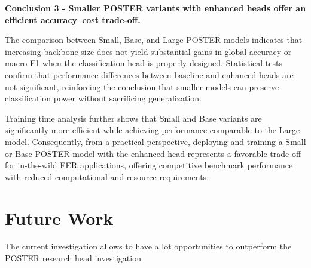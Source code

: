 \textbf{Conclusion 3 - Smaller \gls{POSTER} variants with enhanced heads offer an efficient accuracy–cost trade‑off.}

The comparison between Small, Base, and Large \gls{POSTER} models indicates that increasing backbone size does not yield substantial gains in global accuracy or macro‑F1 when the classification head is properly designed. Statistical tests confirm that performance differences between baseline and enhanced heads are not significant, reinforcing the conclusion that smaller models can preserve classification power without sacrificing generalization.

Training time analysis further shows that Small and Base variants are significantly more efficient while achieving performance comparable to the Large model. Consequently, from a practical perspective, deploying and training a Small or Base \gls{POSTER} model with the enhanced head represents a favorable trade‑off for \gls{in-the-wild} \gls{FER} applications, offering competitive benchmark performance with reduced computational and resource requirements.


\section{Future Work}

The current investigation allows to have a lot opportunities to outperform the \gls{POSTER} \cite{zheng_poster_2022} research head investigation 


